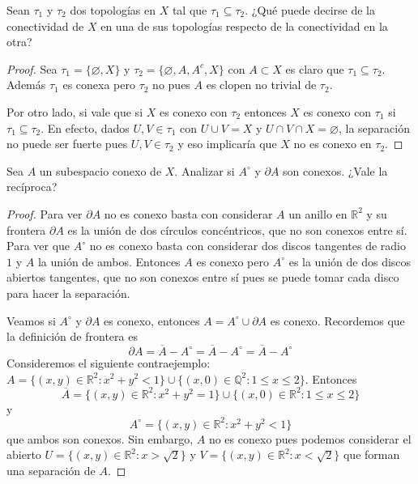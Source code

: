 \documentclass{article}
\theoremstyle{definition}
\newcommand{\R}{\mathbb{R}}
\newcommand{\Q}{\mathbb{Q}}
\newcommand{\cl}[1]{\overline{#1}}              %
\newcommand{\Int}[1]{{#1}^\circ}                %
\newenvironment{ejercicio}[1]{\begin{trivlist}
\item[\hskip \labelsep {\bfseries Ejercicio}\hskip \labelsep {\bfseries #1.}]}{\end{trivlist}}
\begin{document}
\begin{ejercicio}{3}
    Sean \(\tau_1\) y \(\tau_2\) dos topologías en \(X\) tal que \(\tau_1 \subseteq \tau_2\). ¿Qué puede decirse de la conectividad de \(X\) en una de sus topologías respecto de la conectividad en la otra?
\end{ejercicio}
\begin{proof}
    Sea \( \tau_1 = \{ \varnothing, X \} \) y \( \tau_2 = \{ \varnothing, A, A^c, X \} \) con \( A \subset X \) es claro que \( \tau_1 \subseteq \tau_2 \).
    Además \( \tau_1 \) es conexa pero \( \tau_2 \) no pues \( A \) es clopen no trivial de \( \tau_2 \).

    Por otro lado, si vale que si \( X \) es conexo con \( \tau_2 \) entonces \( X \) es conexo con \( \tau_1 \) si \( \tau_1 \subseteq \tau_2 \). En efecto,
    dados \( U, V \in \tau_1 \) con \( U \cup V = X \) y \( U \cap V \cap X = \varnothing \), la separación no puede ser fuerte pues \( U, V \in \tau_2 \) y eso implicaría que \( X \) no es conexo en \( \tau_2 \).
\end{proof}

\begin{ejercicio}{4}
    Sea \(A\) un subespacio conexo de \(X\). Analizar si \( \Int{A} \) y \(\partial A\) son conexos. ¿Vale la recíproca?
\end{ejercicio}
\begin{proof}
    Para ver \( \partial A \) no es conexo basta con considerar \( A \) un anillo en \( \R^2 \) y su frontera \( \partial A \) es la unión de dos círculos concéntricos, que no son conexos entre sí.
    Para ver que \( \Int{A} \) no es conexo basta con considerar dos discos tangentes de radio \( 1 \) y \( A \) la unión de ambos. Entonces \( A \)
    es conexo pero \( \Int{A} \) es la unión de dos discos abiertos tangentes, que no son conexos entre sí pues se puede tomar cada disco para hacer la separación.

    Veamos si \( \Int{A} \) y \( \partial A \) es conexo, entonces \( A = \Int{A} \cup \partial A \) es conexo. Recordemos que la definición de frontera es \[
        \partial A = \cl{A} - \Int{A} = \cl{A} - \Int{A} = \cl{A} - \Int{A}
    \]
    Consideremos el siguiente contraejemplo: \( A = \{ (x, y) \in \R^2 : x^2 + y^2 < 1 \} \cup \{ (x, 0) \in \Q^2 : 1 \leq x \leq 2 \} \).
    Entonces \[ \cl{A} = \{ (x, y) \in \R^2 : x^2 + y^2 = 1 \} \cup \{ (x, 0) \in \R^2 : 1 \leq x \leq 2 \} \] y \[ \Int{A} = \{ (x, y) \in \R^2 : x^2 + y^2 < 1 \} \] que ambos son conexos. Sin embargo,
    \( A \) no es conexo pues podemos considerar el abierto \( U = \{ (x, y) \in \R^2 : x > \sqrt{2} \} \) y \( V = \{ (x, y) \in \R^2 : x < \sqrt{2} \} \) que forman una separación de \( A \).
\end{proof}
\end{document}
